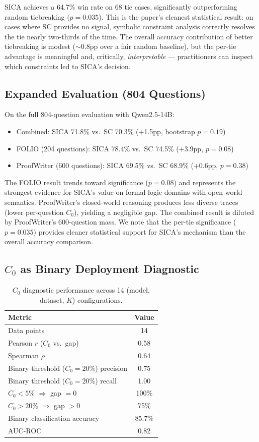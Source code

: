 \documentclass[11pt]{article}
\begin{document}
SICA achieves a 64.7\% win rate on 68 tie cases, significantly outperforming random tiebreaking ($p = 0.035$). This is the paper's cleanest statistical result: on cases where SC provides no signal, symbolic constraint analysis correctly resolves the tie nearly two-thirds of the time. The overall accuracy contribution of better tiebreaking is modest ($\sim$0.8pp over a fair random baseline), but the per-tie advantage is meaningful and, critically, \emph{interpretable} --- practitioners can inspect which constraints led to SICA's decision.

\subsection{Expanded Evaluation (804 Questions)}

On the full 804-question evaluation with Qwen2.5-14B:
\begin{itemize}
    \item Combined: SICA 71.8\% vs.\ SC 70.3\% (+1.5pp, bootstrap $p = 0.19$)
    \item FOLIO (204 questions): SICA 78.4\% vs.\ SC 74.5\% (+3.9pp, $p = 0.08$)
    \item ProofWriter (600 questions): SICA 69.5\% vs.\ SC 68.9\% (+0.6pp, $p = 0.38$)
\end{itemize}

The FOLIO result trends toward significance ($p = 0.08$) and represents the strongest evidence for SICA's value on formal-logic domains with open-world semantics. ProofWriter's closed-world reasoning produces less diverse traces (lower per-question $C_0$), yielding a negligible gap. The combined result is diluted by ProofWriter's 600-question mass. We note that the per-tie significance ($p = 0.035$) provides cleaner statistical support for SICA's mechanism than the overall accuracy comparison.

\subsection{$C_0$ as Binary Deployment Diagnostic}

\begin{table}[t]
\centering
\caption{$C_0$ diagnostic performance across 14 (model, dataset, $K$) configurations.}
\label{tab:diagnostic}
\small
\begin{tabular}{@{}lc@{}}
\toprule
Metric & Value \\
\midrule
Data points & 14 \\
Pearson $r$ ($C_0$ vs.\ gap) & 0.58 \\
Spearman $\rho$ & 0.64 \\
Binary threshold ($C_0 = 20\%$) precision & 0.75 \\
Binary threshold ($C_0 = 20\%$) recall & 1.00 \\
$C_0 < 5\%$ $\Rightarrow$ gap $= 0$ & 100\% \\
$C_0 > 20\%$ $\Rightarrow$ gap $> 0$ & 75\% \\
Binary classification accuracy & 85.7\% \\
AUC-ROC & 0.82 \\
\bottomrule
\end{tabular}
\end{table}
\end{document}
